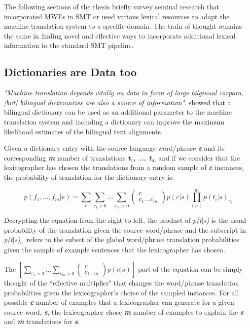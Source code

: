 The following sections of the thesis briefly survey seminal research that incorporated MWEs in SMT or used various lexical resources to adapt the machine translation system to a specific domain. The train of thought remains the same in finding novel and effective ways to incorporate additional lexical information to the standard SMT pipeline.


\subsection{Dictionaries are Data too}

\emph{"Machine translation depends vitally on data in form of large bilginual corpora, [but] bilingual dictionaries are also a source of information"}. \cite{brown1993dictionaries} showed that a bilingual dictionary can be used as an additional parameter to the machine translation system and including a dictionary can improve the maximum likelihood estimates of the bilingual text alignments. 

Given a dictionary entry with the source language word/phrase \emph{\textbf{s}} and its corresponding \emph{\textbf{m}} number of translations \emph{\textbf{t${_1}$, ... t${_m}$}} and if we consider that the lexicographer has chosen the translations from a random sample of \emph{\textbf{c}} instances, the probability of translation for the dictionary entry is:


\begin{equation}
p(f_1, ..., f_m | e) = \sum _{ c }^{  }{ \sum _{ { c }_{ 1 }>0 }^{  }{ ...\sum _{ { c }_{ m }>0 }^{  }{ \left( \begin{matrix} c \\ { c }_{ 1 }...{ c }_{ m } \end{matrix} \right)  } p(c|s) }  } \prod _{ i=1 }^{ m }{ { p({ t }_{ i }|s) }_{ { c }_{ i } } } 
\end{equation}

Decrypting the equation from the right to left, the product of \emph{p(\emph{t}${|}$s)} is the usual probability of the translation given the source word/phrase and the subscript in \emph{p(\emph{t}${|}$s)}${_{c_i}}$ refers to the subset of the global word/phrase translation probabilities given the sample of example sentences that the lexicographer has chosen.

The $ [ \sum _{ { c }_{ 1 }>0 }^{  }{ ...\sum _{ { c }_{ m }>0 }^{  }{ \left( \begin{matrix} c \\ { c }_{ 1...m } \end{matrix} \right)  } p(c|s) } ] $ part of the equation can be simply thought of the ``effective multiplier" that changes the word/phrase translation probabilities given the lexicographer's choice of the sampled instances. For all possible \emph{\textbf{c}} number of examples that a lexicographer can generate for a given source word, \emph{\textbf{s}}, the lexicographer chose \emph{\textbf{m}} number of examples to explain the \emph{\textbf{s}} and \emph{\textbf{m}}  translations for \emph{\textbf{s}}. 

